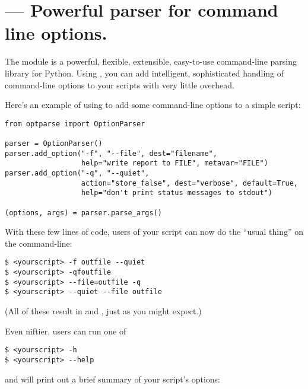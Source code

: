 \section{ ---
        Powerful parser for command line options.}




The  module is a powerful, flexible, extensible,
easy-to-use command-line parsing library for Python.  Using
, you can add intelligent, sophisticated handling of
command-line options to your scripts with very little overhead.

Here's an example of using  to add some command-line
options to a simple script:

\begin{verbatim}
from optparse import OptionParser

parser = OptionParser()
parser.add_option("-f", "--file", dest="filename",
                  help="write report to FILE", metavar="FILE")
parser.add_option("-q", "--quiet",
                  action="store_false", dest="verbose", default=True,
                  help="don't print status messages to stdout")

(options, args) = parser.parse_args()
\end{verbatim}

With these few lines of code, users of your script can now do the
``usual thing'' on the command-line:

\begin{verbatim}
$ <yourscript> -f outfile --quiet
$ <yourscript> -qfoutfile
$ <yourscript> --file=outfile -q
$ <yourscript> --quiet --file outfile
\end{verbatim}

(All of these result in  and
, just as you might expect.)

Even niftier, users can run one of
\begin{verbatim}
$ <yourscript> -h
$ <yourscript> --help
\end{verbatim}
and  will print out a brief summary of your script's
options:

